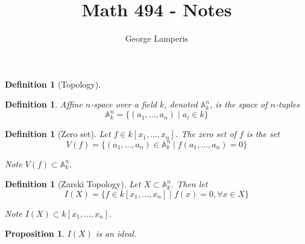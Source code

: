 \documentclass[12pt]{article}
\title{Math 494 - Notes}
\author{George Lamperis}
\date{}
\theoremstyle{mystyle}
\newtheorem{prop}[thm]{Proposition}
\newtheorem{defn}[thm]{Definition}
\newcommand{\Kn}{k[x_1, \ldots, x_n]}
\newcommand{\A}[2]{\mathbb{A}^{#1}_{#2}}
\newcommand{\Ank}{\A{n}{k}}
\begin{document}
\maketitle



\begin{defn}[Topology]
\end{defn}

\begin{defn}
  Affine $n$-space over a field $k$, denoted $\A{n}{k}$, is the space of
  $n$-tuples
  \[ \Ank = \{(a_1, \ldots, a_n) \mid a_i \in k \}\]
\end{defn}

\begin{defn}[Zero set]
  Let $f \in \Kn$. The zero set of $f$ is the set
  \[ V(f) = \{ (a_1, \ldots, a_n) \in \Ank \mid f(a_1, \ldots, a_n) = 0 \}\]
  
  Note $V(f) \subset \Ank$.
\end{defn}

\begin{defn}[Zarski Topology]
Let $X \subset \Ank$. Then let
\[ I(X) = \{ f \in k[x_1, \ldots, x_n] \mid f(x) = 0, \forall x \in X \} \]

Note $I(X) \subset \Kn$.
\end{defn}

\begin{prop}
$I(X)$ is an ideal.
\end{prop}
\end{document}
